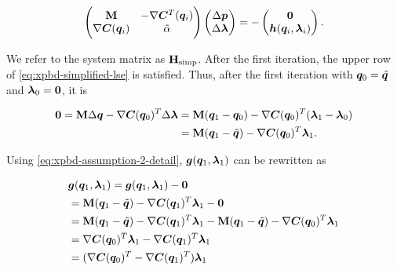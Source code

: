 \begin{equation}\label{eq:xpbd-simplified-lse}
    \begin{pmatrix}
        \mathbf{M} & -\nabla\bm{C}^T(\bm{q}_i) \\
        \nabla \bm{C}(\bm{q}_i) & \tilde{\mathbf{\alpha}}
    \end{pmatrix}
    \begin{pmatrix}
        \Delta \bm{p} \\
        \Delta \bm{\lambda}
    \end{pmatrix}
    = -
    \begin{pmatrix}
    \bm{0} \\
    \bm{h}(\bm{q}_i, \bm{\lambda}_i)
    \end{pmatrix}.
\end{equation}

\noindent We refer to the system matrix as $\mathbf{H}_{\text{simp}}$. After the first iteration, the upper row of \autoref{eq:xpbd-simplified-lse} 
is satisfied. Thus, after the first iteration with $\bm{q}_0 = \tilde{\bm{q}}$ and $\bm{\lambda}_0 = \bm{0}$, it is

\begin{equation}
\begin{split}
    \bm{0} = \mathbf{M}\Delta\bm{q} - \nabla \bm{C}(\bm{q}_0)^T \Delta \bm{\lambda} &= \mathbf{M}(\bm{q}_1 - \bm{q}_0) - \nabla \bm{C}(\bm{q}_0)^T 
    (\bm{\lambda}_1 - \bm{\lambda}_0) \\
    &= \mathbf{M}(\bm{q}_1 - \tilde{\bm{q}}) - \nabla \bm{C}(\bm{q}_0)^T \bm{\lambda}_1. \label{eq:xpbd-assumption-2-detail}
\end{split}
\end{equation}

\noindent Using \autoref{eq:xpbd-assumption-2-detail}, $\bm{g}(\bm{q}_1, \bm{\lambda}_1)$ can be rewritten as

\begin{equation}
\begin{split}
    &\bm{g}(\bm{q}_1, \bm{\lambda}_1) = \bm{g}(\bm{q}_1, \bm{\lambda}_1) - \bm{0} \\
    &= \mathbf{M}(\bm{q}_1 - \tilde{\bm{q}}) - \nabla \bm{C}(\bm{q}_1)^T \bm{\lambda}_1 - \bm{0} \\
    &= \mathbf{M}(\bm{q}_1 - \tilde{\bm{q}}) - \nabla \bm{C}(\bm{q}_1)^T \bm{\lambda}_1 
    - \mathbf{M}(\bm{q}_1 - \tilde{\bm{q}}) - \nabla \bm{C}(\bm{q}_0)^T \bm{\lambda}_1 \\
    &= \nabla \bm{C}(\bm{q}_0)^T \bm{\lambda}_1 - \nabla \bm{C}(\bm{q}_1)^T \bm{\lambda}_1 \\
    &= (\nabla \bm{C}(\bm{q}_0)^T - \nabla \bm{C}(\bm{q}_1)^T) \bm{\lambda}_1
\end{split}
\end{equation}

